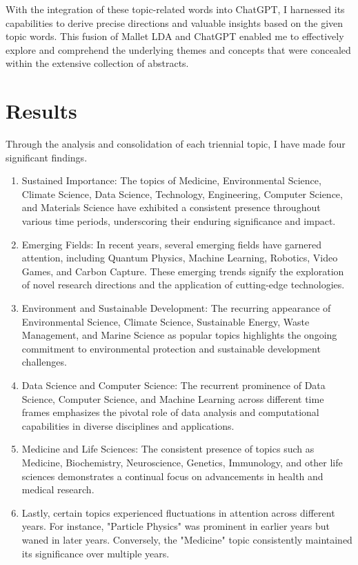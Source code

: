 \documentclass[12pt,twoside]{report}
\begin{document}
With the integration of these topic-related words into ChatGPT, I harnessed its capabilities to derive precise directions and valuable insights based on the given topic words. This fusion of Mallet LDA and ChatGPT enabled me to effectively explore and comprehend the underlying themes and concepts that were concealed within the extensive collection of abstracts.\\


\chapter{Results}
Through the analysis and consolidation of each triennial topic, I have made four significant findings. 
\begin{enumerate}


  \item Sustained Importance: The topics of Medicine, Environmental Science, Climate Science, Data Science, Technology, Engineering, Computer Science, and Materials Science have exhibited a consistent presence throughout various time periods, underscoring their enduring significance and impact.

  \item Emerging Fields: In recent years, several emerging fields have garnered attention, including Quantum Physics, Machine Learning, Robotics, Video Games, and Carbon Capture. These emerging trends signify the exploration of novel research directions and the application of cutting-edge technologies.

  \item Environment and Sustainable Development: The recurring appearance of Environmental Science, Climate Science, Sustainable Energy, Waste Management, and Marine Science as popular topics highlights the ongoing commitment to environmental protection and sustainable development challenges.

  \item Data Science and Computer Science: The recurrent prominence of Data Science, Computer Science, and Machine Learning across different time frames emphasizes the pivotal role of data analysis and computational capabilities in diverse disciplines and applications.

  \item Medicine and Life Sciences: The consistent presence of topics such as Medicine, Biochemistry, Neuroscience, Genetics, Immunology, and other life sciences demonstrates a continual focus on advancements in health and medical research.

  \item Lastly, certain topics experienced fluctuations in attention across different years. For instance, "Particle Physics" was prominent in earlier years but waned in later years. Conversely, the "Medicine" topic consistently maintained its significance over multiple years.\\

  
\end{enumerate}
\end{document}
